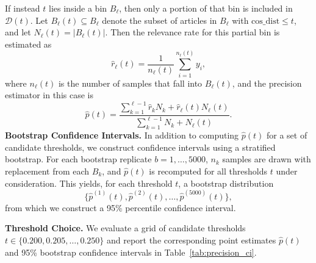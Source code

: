 \documentclass{article}
\begin{document}
If instead $t$ lies inside a bin $B_\ell$, then only a portion of that bin is included in $\mathcal{D}(t)$. Let $B_\ell(t)\subseteq B_\ell$ denote the subset of articles in $B_\ell$ with $\mathrm{cos\_dist}\le t$, and let $N_\ell(t)=|B_\ell(t)|$. Then the relevance rate for this partial bin is estimated as
\[
\hat r_\ell(t)=\frac{1}{n_\ell(t)} \sum_{i=1}^{n_\ell(t)} y_i,
\]
where $n_\ell(t)$ is the number of samples that fall into $B_\ell(t)$, and the precision estimator in this case is
\[
\hat p(t) = \frac{\displaystyle\sum_{k=1}^{\ell-1} \hat r_k N_k
+ \hat r_\ell(t) N_\ell(t)}{\displaystyle\sum_{k=1}^{\ell-1} N_k + N_\ell(t)}.
\]
\textbf{Bootstrap Confidence Intervals.}
In addition to computing $\hat p(t)$ for a set of candidate thresholds, we construct confidence intervals using a stratified bootstrap. 
For each bootstrap replicate $b=1,\dots,5000$, $n_k$ samples are drawn with replacement from each $B_k$, and $\hat p(t)$ is recomputed for all thresholds $t$ under consideration. 
This yields, for each threshold $t$, a bootstrap distribution
\[
\{\hat p^{(1)}(t),\hat p^{(2)}(t),\dots,\hat p^{(5000)}(t)\},
\]
from which we construct a 95\% percentile confidence interval.

\textbf{Threshold Choice.}
We evaluate a grid of candidate thresholds $t\in\{0.200, 0.205, \dots, 0.250\}$ and report the corresponding point estimates $\hat p(t)$ and 95\% bootstrap confidence intervals in Table~\ref{tab:precision_ci}.
\end{document}
